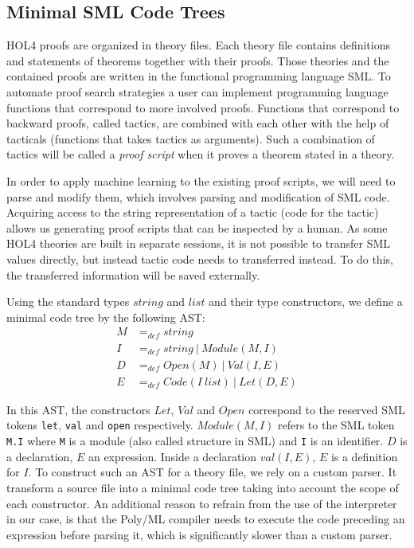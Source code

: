 \documentclass[runningheads,a4paper,draft]{svjour3}
\def\holfour{\textsf{HOL4}\xspace}
\def\sml{\textsf{SML}\xspace}
\def\polyml{\textsf{Poly/ML}\xspace}
\begin{document}
\subsection{Minimal \sml Code Trees}
\holfour proofs are organized in theory files.
Each theory file contains definitions and statements of theorems together with
their proofs. Those theories and the contained proofs
are written
in the functional programming language \sml. To automate
proof search strategies a user can implement programming language functions
that correspond to more involved proofs.
Functions that correspond to backward proofs, called tactics, are combined with each other with the help of 
tacticals (functions that takes
tactics as arguments). Such a combination of tactics will be called a \emph{proof script} when it
proves a theorem stated in a theory.

In order to apply machine learning to the existing proof scripts, we will need to
parse and modify them, which involves parsing and modification of \sml code.
Acquiring access to the string representation of a tactic (code for the tactic) 
allows us generating
proof scripts that can be inspected by a human.
As some \holfour theories are built in separate sessions, it is not possible
to transfer \sml values directly, but instead tactic code needs to transferred instead.
To do this, the transferred information will be saved externally.

Using the standard types $string$ and $list$ and their type constructors,
we define a minimal code tree by the following AST:
\begin{align*}
M &=_{def} string \\
I &=_{def} string\ \vert\ Module(M,I)\\
D &=_{def} Open(M)\ \vert\  Val(I,E) \\
E &=_{def} Code(I\ list)\ \vert\   Let (D,E)
\end{align*}

In this AST, the constructors $Let$, $Val$ and $Open$ correspond to
the reserved \sml tokens \texttt{let}, \texttt{val} and \texttt{open} 
respectively. $Module(M,I)$ refers to the \sml token \texttt{M.I} where 
\texttt{M} is a module (also called structure in \sml) and \texttt{I} is an 
identifier. $D$ is a declaration, $E$ an expression. Inside a 
declaration $val(I,E)$, $E$ is a definition for $I$.
To construct such an AST for a theory file, we rely on a custom parser. It transform a source file into a 
minimal code tree taking into account the scope of each constructor.
An additional reason to refrain from the use of the interpreter in our case, is that
the \polyml compiler needs to execute the code preceding an expression 
before parsing it, which is significantly slower than a custom parser.
\end{document}
